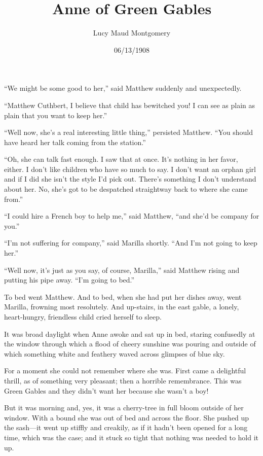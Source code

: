 \documentclass[a4paper]{article}
\title{Anne of Green Gables}
\author{Lucy Maud Montgomery}
\date{06/13/1908}
\begin{document}
\maketitle


``We might be some good to her,'' said Matthew suddenly and unexpectedly.

``Matthew Cuthbert, I believe that child has bewitched you! I can see as plain as plain that you want to keep her.''

\tiny{``Well now, she's a real interesting little thing,'' persisted Matthew. ``You should have heard her talk coming from the station.''}

``Oh, she can talk fast enough. I saw that at once. It's nothing in her favor, either. I don't like children who have so much to say. I don't want an orphan girl and if I did she isn't the style I'd pick out. There's something I don't understand about her. No, she's got to be despatched straightway back to where she came from.''

``I could hire a French boy to help me,'' said Matthew, ``and she'd be company for you.''

\scriptsize{``I'm not suffering for company,'' said Marilla shortly. ``And I'm not going to keep her.''}

``Well now, it's just as you say, of course, Marilla,'' said Matthew rising and putting his pipe away. ``I'm going to bed.''

To bed went Matthew. And to bed, when she had put her dishes away, went Marilla, frowning most resolutely. And up-stairs, in the east gable, a lonely, heart-hungry, friendless child cried herself to sleep.

\footnotesize{It was broad daylight when Anne awoke and sat up in bed, staring confusedly at the window through which a flood of cheery sunshine was pouring and outside of which something white and feathery waved across glimpses of blue sky.}

For a moment she could not remember where she was. First came a delightful thrill, as of something very pleasant; then a horrible remembrance. This was Green Gables and they didn't want her because she wasn't a boy!

But it was morning and, yes, it was a cherry-tree in full bloom outside of her window. With a bound she was out of bed and across the floor. She pushed up the sash---it went up stiffly and creakily, as if it hadn't been opened for a long time, which was the case; and it stuck so tight that nothing was needed to hold it up.
\end{document}
